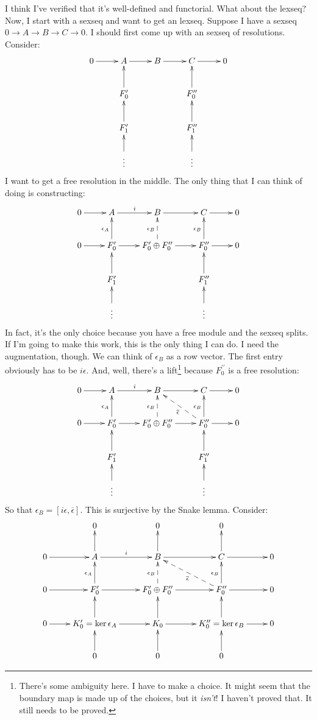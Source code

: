 I think I've verified that it's well-defined and functorial. What about the lexseq? Now, I start with a sexseq and want to get an lexseq. Suppose I have a sexseq $0\to A\to B\to C\to 0$. I should first come up with an sexseq of resolutions. Consider:
\begin{equation*}
\xymatrix{0\ar[r] & A\ar[r] & B\ar[r] & C\ar[r] & 0\\
 & F^\prime_0\ar[u] & & F^{\prime\prime}_0\ar[u] & \\
 & F^\prime_1\ar[u] & & F^{\prime\prime}_1\ar[u] & \\
 & \vdots\ar[u] & & \vdots\ar[u] & }
\end{equation*}
I want to get a free resolution in the middle. The only thing that I can think of doing is constructing:
\begin{equation*}
\xymatrix{0\ar[r] & A\ar[r]^i & B\ar[r] & C\ar[r] & 0\\
0\ar[r] & F^\prime_0\ar[u]^{\epsilon_A}\ar[r] & F^\prime_0\oplus F^{\prime\prime}_0\ar@{-->}[u]^{\epsilon_B}\ar[r] & F^{\prime\prime}_0\ar[u]^{\epsilon_B}\ar[r] & 0 \\
 & F^\prime_1\ar[u] & & F^{\prime\prime}_1\ar[u] & \\
 & \vdots\ar[u] & & \vdots\ar[u] & }
\end{equation*}
In fact, it's the only choice because you have a free module and the sexseq splits. If I'm going to make this work, this is the only thing I can do. I need the augmentation, though. We can think of $\epsilon_B$ as a row vector. The first entry obviously has to be $i\epsilon$. And, well, there's a lift\footnote{There's some ambiguity here. I have to make a choice. It might seem that the boundary map is made up of the choices, but it \emph{isn't}! I haven't proved that. It still needs to be proved.} because $F^{\prime\prime}_0$ is a free resolution:
\begin{equation*}
\xymatrix{0\ar[r] & A\ar[r]^i & B\ar[r] & C\ar[r] & 0\\
0\ar[r] & F^\prime_0\ar[u]^{\epsilon_A}\ar[r] & F^\prime_0\oplus F^{\prime\prime}_0\ar@{-->}[u]^{\epsilon_B}\ar[r] & F^{\prime\prime}_0\ar[u]^{\epsilon_B}\ar@{-->}[ul]^{\overline{\epsilon}}\ar[r] & 0 \\
 & F^\prime_1\ar[u] & & F^{\prime\prime}_1\ar[u] & \\
 & \vdots\ar[u] & & \vdots\ar[u] & }
\end{equation*}
So that $\epsilon_B=[i\epsilon,\overline{\epsilon}]$. This is surjective by the Snake lemma. Consider:
\begin{equation*}
\xymatrix{& 0 & 0 & 0 & \\
0\ar[r] & A\ar[r]^i\ar[u] & B\ar[r]\ar[u] & C\ar[r]\ar[u] & 0\\
0\ar[r] & F^\prime_0\ar[u]^{\epsilon_A}\ar[r] & F^\prime_0\oplus F^{\prime\prime}_0\ar@{-->}[u]^{\epsilon_B}\ar[r] & F^{\prime\prime}_0\ar[u]^{\epsilon_B}\ar@{-->}[ul]^{\overline{\epsilon}}\ar[r] & 0\\
 0\ar[r] & K^\prime_0=\ker\epsilon_A\ar[u]\ar[r] & K_0\ar[r]\ar[u] & K^{\prime\prime}_0=\ker\epsilon_B\ar[u]\ar[r] & 0\\
 & 0\ar[u] & 0\ar[u] & 0\ar[u] & }
\end{equation*}
